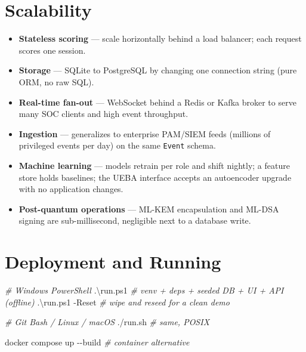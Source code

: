 \documentclass[
]{article}
\newenvironment{Shaded}{}{}
\newcommand{\AttributeTok}[1]{\textcolor[rgb]{0.49,0.56,0.16}{#1}}
\newcommand{\CommentTok}[1]{\textcolor[rgb]{0.38,0.63,0.69}{\textit{#1}}}
\newcommand{\ExtensionTok}[1]{#1}
\newcommand{\FunctionTok}[1]{\textcolor[rgb]{0.02,0.16,0.49}{#1}}
\newcommand{\NormalTok}[1]{#1}
\newcommand{\OperatorTok}[1]{\textcolor[rgb]{0.40,0.40,0.40}{#1}}
\providecommand{\tightlist}{%
  \setlength{\itemsep}{0pt}\setlength{\parskip}{0pt}}
\begin{document}
\section{Scalability}\label{scalability}

\begin{itemize}
\tightlist
\item
  \textbf{Stateless scoring} --- scale horizontally behind a load
  balancer; each request scores one session.
\item
  \textbf{Storage} --- SQLite to PostgreSQL by changing one connection
  string (pure ORM, no raw SQL).
\item
  \textbf{Real-time fan-out} --- WebSocket behind a Redis or Kafka
  broker to serve many SOC clients and high event throughput.
\item
  \textbf{Ingestion} --- generalizes to enterprise PAM/SIEM feeds
  (millions of privileged events per day) on the same \texttt{Event}
  schema.
\item
  \textbf{Machine learning} --- models retrain per role and shift
  nightly; a feature store holds baselines; the UEBA interface accepts
  an autoencoder upgrade with no application changes.
\item
  \textbf{Post-quantum operations} --- ML-KEM encapsulation and ML-DSA
  signing are sub-millisecond, negligible next to a database write.
\end{itemize}

\section{Deployment and Running}\label{deployment-and-running}

\begin{Shaded}
\begin{Highlighting}[]
\CommentTok{\# Windows PowerShell}
\OperatorTok{.}\NormalTok{\textbackslash{}run}\OperatorTok{.}\FunctionTok{ps1}              \CommentTok{\# venv + deps + seeded DB + UI + API (offline)}
\OperatorTok{.}\NormalTok{\textbackslash{}run}\OperatorTok{.}\FunctionTok{ps1} \OperatorTok{{-}}\NormalTok{Reset       }\CommentTok{\# wipe and reseed for a clean demo}
\end{Highlighting}
\end{Shaded}

\begin{Shaded}
\begin{Highlighting}[]
\CommentTok{\# Git Bash / Linux / macOS}
\ExtensionTok{./run.sh}               \CommentTok{\# same, POSIX}

\ExtensionTok{docker}\NormalTok{ compose up }\AttributeTok{{-}{-}build}      \CommentTok{\# container alternative}
\end{Highlighting}
\end{Shaded}
\end{document}
